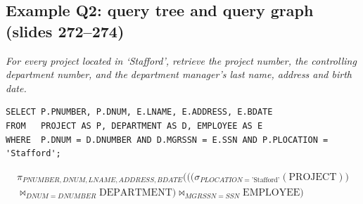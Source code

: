 \documentclass[10pt,a4paper]{article}
\newcommand{\R}[1]{\mathrm{#1}}
\begin{document}
\subsection{Example Q2: query tree and query graph (slides 272--274)}
\begin{exbox}[Q2]
\emph{For every project located in `Stafford', retrieve the project number, the controlling department number, and the department manager's last name, address and birth date.}
\begin{verbatim}
SELECT P.PNUMBER, P.DNUM, E.LNAME, E.ADDRESS, E.BDATE
FROM   PROJECT AS P, DEPARTMENT AS D, EMPLOYEE AS E
WHERE  P.DNUM = D.DNUMBER AND D.MGRSSN = E.SSN AND P.PLOCATION = 'Stafford';
\end{verbatim}
\begin{multline*}
\pi_{PNUMBER,DNUM,LNAME,ADDRESS,BDATE}\Big(\big(\big(\sigma_{PLOCATION=\text{'Stafford'}}(\R{PROJECT})\big)\\
\bowtie_{DNUM=DNUMBER} \R{DEPARTMENT}\big) \bowtie_{MGRSSN=SSN} \R{EMPLOYEE}\Big)
\end{multline*}
\end{exbox}
\end{document}
